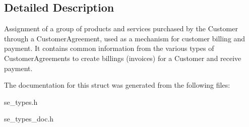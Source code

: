 \subsection{Detailed Description}
Assignment of a group of products and services purchased by the Customer through a Customer\+Agreement, used as a mechanism for customer billing and payment. It contains common information from the various types of Customer\+Agreements to create billings (invoices) for a Customer and receive payment. 

The documentation for this struct was generated from the following files\+:\begin{DoxyCompactItemize}
\item 
se\+\_\+types.\+h\item 
se\+\_\+types\+\_\+doc.\+h\end{DoxyCompactItemize}
